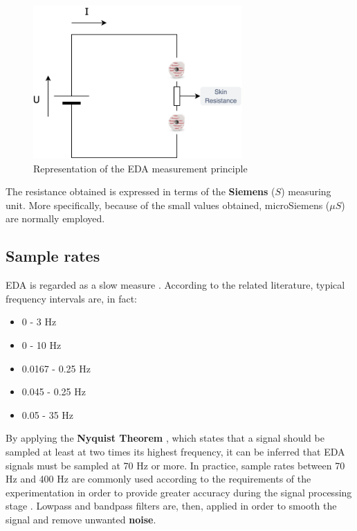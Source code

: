 \begin{figure}[h]
    \centering
    \includegraphics[width=8cm]{./images/skin-resistance.drawio.png}
    \caption{Representation of the EDA measurement principle}
    \label{fig:eda-ans}
\end{figure}

The resistance obtained is expressed in terms of the \textbf{Siemens} ($S$) measuring unit. More specifically, because of the small values obtained, microSiemens ($\mu S$) are normally employed.

\subsection{Sample rates}\label{subsec:eda-signal-properties}

EDA is regarded as a slow measure \cite{eda-guide}. According to the related literature, typical frequency intervals are, in fact:

\begin{itemize}
    \item 0 - 3 Hz \cite{biosignalplux-guide}
    \item 0 - 10 Hz \cite{eda-hci}
    \item 0.0167 - 0.25 Hz \cite{eda-interval-3}
    \item 0.045 - 0.25 Hz \cite{eda-interval-4}
    \item 0.05 - 35 Hz \cite{eda-guide}
\end{itemize}

By applying the \textbf{Nyquist Theorem} \cite{nyquist}, which states that a signal should be sampled at least at two times its highest frequency, it can be inferred that EDA signals must be sampled at 70 Hz or more. In practice, sample rates between 70 Hz and 400 Hz are commonly used according to the requirements of the experimentation in order to provide greater accuracy during the signal processing stage \cite{eda-guide}. Lowpass and bandpass filters are, then, applied in order to smooth the signal and remove unwanted \textbf{noise}.

